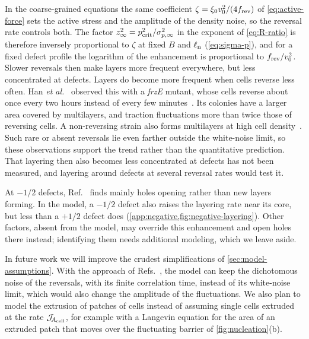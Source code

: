 \documentclass[aps,pre,reprint,superscriptaddress,longbibliography,nofootinbib
]{revtex4-2}
\begin{document}
In the coarse-grained equations the same coefficient
$\zeta=\xi_0v_0^2/(4f_{\rm rev})$ of \cref{eq:active-force} sets
the active stress and the amplitude of the density noise,
so the reversal rate controls both. The factor
$z_\infty^2=p_{\rm crit}^2/\sigma_{p,\infty}^2$ in the exponent
of \cref{eq:R-ratio} is therefore inversely proportional to
$\zeta$ at fixed $B$ and $\ell_{\rm n}$ (\cref{eq:sigma-p}), and
for a fixed defect profile the logarithm of the enhancement
is proportional to $f_{\rm rev}/v_0^2$. Slower reversals then
make layers more frequent everywhere, but less concentrated
at defects. Layers do become more frequent when cells
reverse less often. Han \textit{et al.}~\cite{han2025local}
observed this with a \textit{frzE} mutant, whose cells
reverse about once every two hours instead of every few
minutes~\cite{blackhart1985frizzy}. Its colonies have a
larger area covered by multilayers, and traction
fluctuations more than twice those of reversing cells. A
non-reversing strain also forms multilayers at high cell
density~\cite{peruani2012collective}. Such rare or absent
reversals lie even farther outside the white-noise limit,
so these observations support the trend rather than the
quantitative prediction. That layering then also becomes
less concentrated at defects has not been measured, and
layering around defects at several reversal rates would
test it.


At $-1/2$ defects, Ref.~\cite{copenhagen2021} finds mainly
holes opening rather than new layers forming. In the model,
a $-1/2$ defect also raises the layering rate near its
core, but less than a $+1/2$ defect does
(\cref{app:negative,fig:negative-layering}). Other factors,
absent from the model, may override this enhancement and
open holes there instead; identifying them needs additional
modeling, which we leave aside.

In future work we will improve the crudest simplifications
of \cref{sec:model-assumptions}. With the approach of
Refs.~\cite{bressloff2024global,spinney2025dean}, the model
can keep the dichotomous noise of the reversals, with its
finite correlation time, instead of its white-noise limit,
which would also change the amplitude of the fluctuations.
We also plan to model the extrusion of patches of cells
instead of assuming single cells extruded at the rate
$\mathcal{J}_{\!{A_{\rm cell}}}$, for example with a Langevin equation
for the area of an extruded patch that moves over the
fluctuating barrier of \cref{fig:nucleation}(b).
\end{document}
